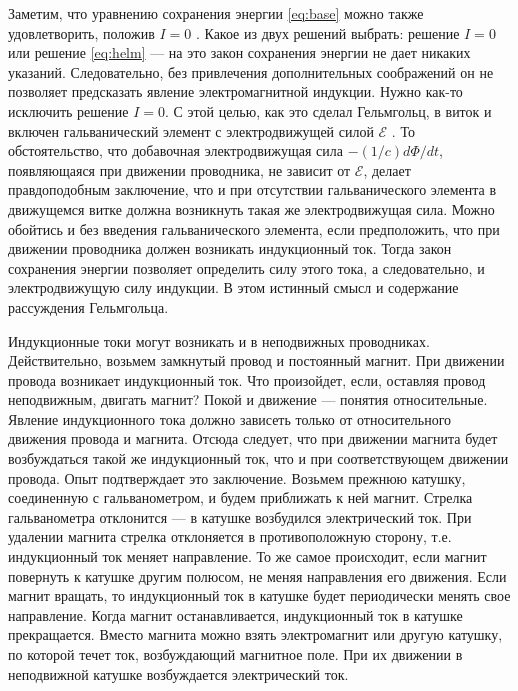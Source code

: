 Заметим, что уравнению сохранения
энергии \eqref{eq:base} можно также
удовлетворить, положив $I=0$ . Какое из
двух решений выбрать: решение $I=0$  или
решение \eqref{eq:helm} --- на это закон сохранения
энергии не дает никаких указаний.
Следовательно, без привлечения
дополнительных соображений он не
позволяет предсказать явление
электромагнитной индукции. Нужно как-то
исключить решение $I = 0$. С этой целью,
как это сделал Гельмгольц, в виток и
включен гальванический элемент с
электродвижущей силой $\mathscr{E}$ . То
обстоятельство, что добавочная
электродвижущая сила $-(1/c)d\Phi/dt$,
появляющаяся при движении проводника, не
зависит от $\mathscr{E}$, делает правдоподобным
заключение, что и при отсутствии
гальванического элемента в движущемся
витке должна возникнуть такая же
электродвижущая сила. Можно обойтись и
без введения гальванического элемента,
если предположить, что при движении
проводника должен возникать индукционный
ток. Тогда закон сохранения энергии
позволяет определить силу этого тока, а
следовательно, и электродвижущую силу
индукции. В этом истинный смысл и
содержание рассуждения Гельмгольца.

Индукционные токи могут
возникать и в неподвижных проводниках.
Действительно, возьмем замкнутый провод
и постоянный магнит. При движении
провода возникает индукционный ток. Что
произойдет, если, оставляя провод
неподвижным, двигать магнит? Покой и
движение — понятия относительные.
Явление индукционного тока должно
зависеть только от относительного
движения провода и магнита. Отсюда
следует, что при движении магнита будет
возбуждаться такой же индукционный ток,
что и при соответствующем движении
провода. Опыт подтверждает это
заключение. Возьмем прежнюю катушку,
соединенную с гальванометром, и будем
приближать к ней магнит. Стрелка
гальванометра отклонится — в катушке
возбудился электрический ток. При
удалении магнита стрелка отклоняется в
противоположную сторону, т.е.
индукционный ток меняет направление. То
же самое происходит, если магнит
повернуть к катушке другим полюсом, не
меняя направления его движения. Если
магнит вращать, то индукционный ток в
катушке будет периодически менять свое
направление. Когда магнит
останавливается, индукционный ток в
катушке прекращается. Вместо магнита
можно взять электромагнит или другую
катушку, по которой течет ток,
возбуждающий магнитное поле. При их
движении в неподвижной катушке
возбуждается электрический ток.

